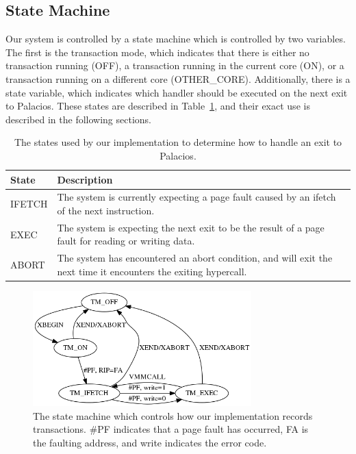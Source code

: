 \documentclass{acm_proc_article-sp}
\begin{document}
\subsection{State Machine}

Our system is controlled by a state machine which is controlled by two
variables. The first is the transaction mode, which indicates that there is 
either no transaction running (OFF), a transaction running in the current 
core (ON), or a transaction running on a different core (OTHER\_CORE). 
Additionally, there is a state variable, which indicates which handler should
be executed on the next exit to Palacios. These states are described in 
Table~\ref{statetable}, and their exact use is described in the following
sections.

\begin{table}
\begin{center}
    \begin{tabular}{| l | l |}
    \hline
    State & Description \\
    \hline
    IFETCH & The system is currently expecting a page fault caused by an ifetch
                of the next instruction. \\
    \hline
    EXEC & The system is expecting the next exit to be the result of a page fault for
                reading or writing data. \\
    \hline
    ABORT & The system has encountered an abort condition, and will exit the next time
                it encounters the exiting hypercall. \\
    \hline 
    \end{tabular}
    \caption{The states used by our implementation to determine how to handle an exit
             to Palacios.}
\label{statetable}
\end{center}
\end{table}


\begin{figure}[t]
\centering
\includegraphics[height=1.75in]{figs/fsm.png}
\caption{The state machine which controls how our implementation records 
transactions. \#PF indicates that a page fault has occurred, FA is the faulting
address, and write indicates the error code.}
\label{flowchart}
\end{figure}
\end{document}

